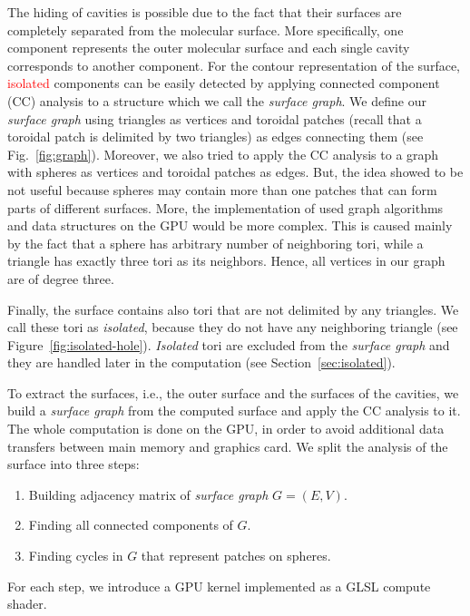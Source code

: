 The hiding of cavities is possible due to the fact that their surfaces are completely separated from the molecular surface.
More specifically, one component represents the outer molecular surface and each single cavity corresponds to another component.
For the contour representation of the surface, \textcolor{red}{isolated} components can be easily detected by applying connected component (CC) analysis to a structure which we call the \textit{surface graph}.
We define our \textit{surface graph} using triangles as vertices and toroidal patches (recall that a toroidal patch is delimited by two triangles) as edges connecting them (see Fig.~\ref{fig:graph}).
Moreover, we also tried to apply the CC analysis to a graph with spheres as vertices and toroidal patches as edges.
But, the idea showed to be not useful because spheres may contain more than one patches that can form parts of different surfaces.
More, the implementation of used graph algorithms and data structures on the GPU would be more complex.
This is caused mainly by the fact that a sphere has arbitrary number of neighboring tori, while a triangle has exactly three tori as its neighbors.
Hence, all vertices in our graph are of degree three.

Finally, the surface contains also tori that are not delimited by any triangles.
We call these tori as \textit{isolated}, because they do not have any neighboring triangle (see Figure~\ref{fig:isolated-hole}).
\textit{Isolated} tori are excluded from the \textit{surface graph} and they are handled later in the computation (see Section~\ref{sec:isolated}).


To extract the surfaces, i.e., the outer surface and the surfaces of the cavities, we build a \textit{surface graph} from the computed surface and apply the CC analysis to it.
The whole computation is done on the GPU, in order to avoid additional data transfers between main memory and graphics card.
We split the analysis of the surface into three steps:
\begin{enumerate}
  \item Building adjacency matrix of \textit{surface graph} $G = (E, V)$.
	\item Finding all connected components of $G$.
	\item Finding cycles in $G$ that represent patches on spheres.
\end{enumerate}
For each step, we introduce a GPU kernel implemented as a GLSL compute shader.

